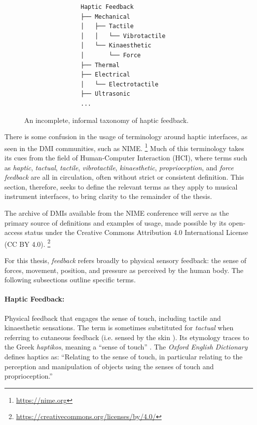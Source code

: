 \begin{figure}
    \begin{center}
        \begin{minipage}{0.66\linewidth}
            \begin{verbatim}
                Haptic Feedback
                ├── Mechanical        
                │   ├── Tactile      
                │   │   └── Vibrotactile
                │   └── Kinaesthetic
                │       └── Force
                ├── Thermal
                ├── Electrical
                │   └── Electrotactile
                ├── Ultrasonic
                ...
            \end{verbatim}
        \end{minipage}
    \end{center}
    \caption{An incomplete, informal taxonomy of haptic feedback.}
    \label{fig:taxonomy}
\end{figure}

There is some confusion in the usage of terminology around haptic interfaces, as seen in the DMI communities, such as NIME.
\footnote{\url{https://nime.org}}
Much of this terminology takes its cues from the field of Human-Computer Interaction (HCI), where terms such as \emph{haptic}, \emph{tactual}, \emph{tactile}, \emph{vibrotactile}, \emph{kinaesthetic}, \emph{proprioception}, and \emph{force feedback} are all in circulation, often without strict or consistent definition. This section, therefore, seeks to define the relevant terms as they apply to musical instrument interfaces, to bring clarity to the remainder of the thesis.  

The archive of DMIs available from the NIME conference will serve as the primary source of definitions and examples of usage, made possible by its open-access status under the Creative Commons Attribution 4.0 International License (CC BY 4.0).%
\footnote{\url{https://creativecommons.org/licenses/by/4.0/}}  

For this thesis, \emph{feedback} refers broadly to physical sensory feedback: the sense of forces, movement, position, and pressure as perceived by the human body. The following subsections outline specific terms.  

\paragraph{Haptic Feedback:} Physical feedback that engages the sense of touch, including tactile and kinaesthetic sensations. The term is sometimes substituted for \emph{tactual} when referring to cutaneous feedback (i.e. sensed by the skin \cite{bongers_tactual_1998, srinivasan_tactual_1996}). Its etymology traces to the Greek \emph{haptikos}, meaning a ``sense of touch'' \cite{culmer_haptics_2020}. The \emph{Oxford English Dictionary} defines haptics as: ``Relating to the sense of touch, in particular relating to the perception and manipulation of objects using the senses of touch and proprioception.''  

